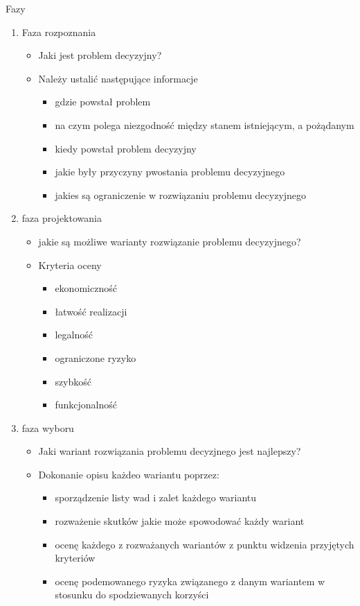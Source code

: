 \documentclass[a4paper,10pt]{report}
\begin{document}
\noindent Fazy
\begin{enumerate}
	\item Faza rozpoznania
	\begin{itemize}
		\item Jaki jest problem decyzyjny?
		\item Należy ustalić następujące informacje
		\begin{itemize}
			\item gdzie powstał problem
			\item na czym polega niezgodność między stanem istniejącym, a pożądanym
			\item kiedy powstał problem decyzyjny
			\item jakie były przyczyny pwostania problemu decyzyjnego
			\item jakies są ograniczenie w rozwiązaniu problemu decyzyjnego
		\end{itemize}
	\end{itemize}
	\item faza projektowania
	\begin{itemize}
		\item jakie są możliwe warianty rozwiązanie problemu decyzyjnego?
		\item Kryteria oceny
		\begin{itemize}
			\item ekonomiczność
			\item łatwość realizacji
			\item legalność
			\item ograniczone ryzyko
			\item szybkość
			\item funkcjonalność
		\end{itemize}
	\end{itemize}
	\item faza wyboru
	\begin{itemize}
		\item Jaki wariant rozwiązania problemu decyzjnego jest najlepszy?
		\item Dokonanie opisu każdeo wariantu poprzez:
		\begin{itemize}
			\item sporządzenie listy wad i zalet każdego wariantu
			\item rozważenie skutków jakie może spowodować każdy wariant
			\item ocenę każdego z rozważanych wariantów z punktu widzenia przyjętych kryteriów
			\item ocenę podemowanego ryzyka związanego z danym wariantem w stosunku do spodziewanych korzyści
		\end{itemize}
	\end{itemize}
\end{enumerate}
\end{document}
